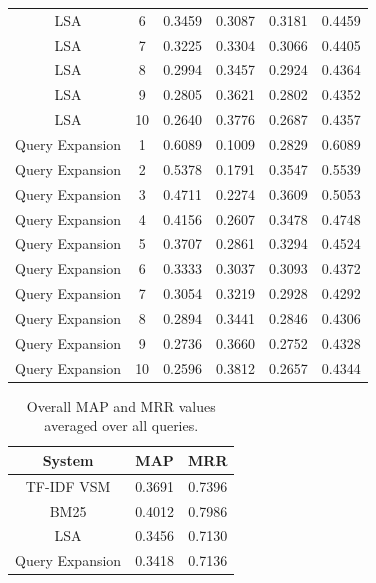\begin{table}[H]
{\begin{tabular}{|c|c|c|c|c|c|}
LSA & 6 & 0.3459 & 0.3087 & 0.3181 & 0.4459 \\
LSA & 7 & 0.3225 & 0.3304 & 0.3066 & 0.4405 \\
LSA & 8 & 0.2994 & 0.3457 & 0.2924 & 0.4364 \\
LSA & 9 & 0.2805 & 0.3621 & 0.2802 & 0.4352 \\
LSA & 10 & 0.2640 & 0.3776 & 0.2687 & 0.4357 \\
\hline
Query Expansion & 1 & 0.6089 & 0.1009 & 0.2829 & 0.6089 \\
Query Expansion & 2 & 0.5378 & 0.1791 & 0.3547 & 0.5539 \\
Query Expansion & 3 & 0.4711 & 0.2274 & 0.3609 & 0.5053 \\
Query Expansion & 4 & 0.4156 & 0.2607 & 0.3478 & 0.4748 \\
Query Expansion & 5 & 0.3707 & 0.2861 & 0.3294 & 0.4524 \\
Query Expansion & 6 & 0.3333 & 0.3037 & 0.3093 & 0.4372 \\
Query Expansion & 7 & 0.3054 & 0.3219 & 0.2928 & 0.4292 \\
Query Expansion & 8 & 0.2894 & 0.3441 & 0.2846 & 0.4306 \\
Query Expansion & 9 & 0.2736 & 0.3660 & 0.2752 & 0.4328 \\
Query Expansion & 10 & 0.2596 & 0.3812 & 0.2657 & 0.4344 \\
\hline
\end{tabular}
}
\end{table}

\begin{table}[H]
\centering
\caption{Overall MAP and MRR values averaged over all queries.}
\label{tab:map_mrr}
\begin{tabular}{|c|c|c|}
\hline
System & MAP & MRR \\
\hline
TF-IDF VSM & 0.3691 & 0.7396 \\
BM25 & 0.4012 & 0.7986 \\
LSA & 0.3456 & 0.7130 \\
Query Expansion & 0.3418 & 0.7136 \\
\hline
\end{tabular}
\end{table}